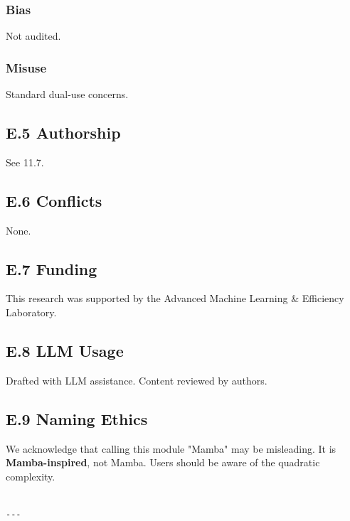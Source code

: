 \subsubsection{Bias}
Not audited.

\subsubsection{Misuse}
Standard dual-use concerns.

\subsection{E.5 Authorship}

See  11.7.

\subsection{E.6 Conflicts}

None.

\subsection{E.7 Funding}

This research was supported by the Advanced Machine Learning & Efficiency Laboratory.

\subsection{E.8 LLM Usage}

Drafted with LLM assistance. Content reviewed by authors.

\subsection{E.9 Naming Ethics}

We acknowledge that calling this module "Mamba" may be misleading. It is 
\textbf{Mamba-inspired}, not Mamba. Users should be aware of the quadratic 
complexity.
\begin{lstlisting}

---
\end{lstlisting}